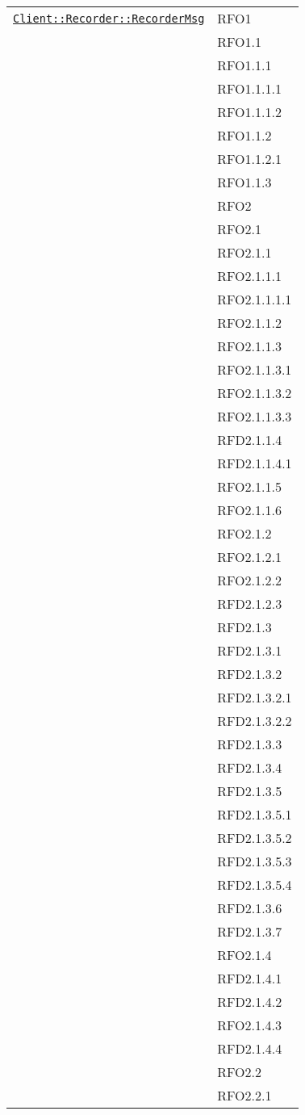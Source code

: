 \begin{longtable}{|>{\centering}m{10cm}|m{3cm}<{\centering}|}
\hyperref[Client::Recorder::RecorderMsg]{\texttt{Client::Recorder::RecorderMsg}} & RFO1\\
& RFO1.1\\
& RFO1.1.1\\
& RFO1.1.1.1\\
& RFO1.1.1.2\\
& RFO1.1.2\\
& RFO1.1.2.1\\
& RFO1.1.3\\
& RFO2\\
& RFO2.1\\
& RFO2.1.1\\
& RFO2.1.1.1\\
& RFO2.1.1.1.1\\
& RFO2.1.1.2\\
& RFO2.1.1.3\\
& RFO2.1.1.3.1\\
& RFO2.1.1.3.2\\
& RFO2.1.1.3.3\\
& RFD2.1.1.4\\
& RFD2.1.1.4.1\\
& RFO2.1.1.5\\
& RFO2.1.1.6\\
& RFO2.1.2\\
& RFO2.1.2.1\\
& RFO2.1.2.2\\
& RFD2.1.2.3\\
& RFD2.1.3\\
& RFD2.1.3.1\\
& RFD2.1.3.2\\
& RFD2.1.3.2.1\\
& RFD2.1.3.2.2\\
& RFD2.1.3.3\\
& RFD2.1.3.4\\
& RFD2.1.3.5\\
& RFD2.1.3.5.1\\
& RFD2.1.3.5.2\\
& RFD2.1.3.5.3\\
& RFD2.1.3.5.4\\
& RFD2.1.3.6\\
& RFD2.1.3.7\\
& RFO2.1.4\\
& RFD2.1.4.1\\
& RFD2.1.4.2\\
& RFO2.1.4.3\\
& RFD2.1.4.4\\
& RFO2.2\\
& RFO2.2.1\\

\end{longtable}
